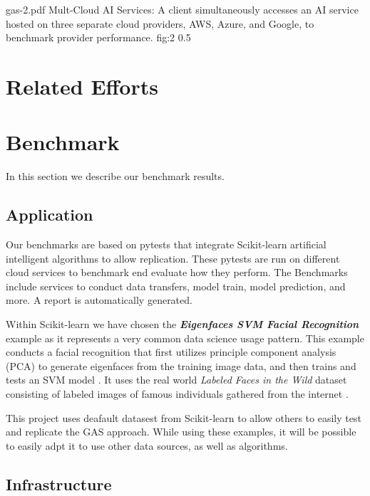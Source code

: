 \OneFIGURE
  {gas-2.pdf}
  {Mult-Cloud AI Services: A client simultaneously accesses an AI service hosted
   on three separate cloud providers, AWS, Azure, and Google, to benchmark
   provider performance.}
  {fig:2}
  {0.5}

\section{Related Efforts}


\section{Benchmark}
\label{sec:benchmark}

In this section we describe our benchmark results.

\subsection{Application}

Our benchmarks are based on pytests that integrate Scikit-learn
artificial intelligent algorithms to allow replication. These pytests
are run on different cloud services to benchmark end evaluate how they
perform. The Benchmarks include services to conduct data transfers,
model train, model prediction, and more. A report is automatically generated. 

Within Scikit-learn we have chosen the {\bf\em Eigenfaces SVM Facial
Recognition} example as it represents a very common data science usage
pattern. This example conducts a facial recognition that first
utilizes principle component analysis (PCA) to generate eigenfaces
from the training image data, and then trains and tests an SVM
model \cite{www-skikit-learn-faces}. It uses the real world
{\em Labeled Faces in the Wild} dataset consisting of labeled images
of famous individuals gathered from the internet \cite{faces-data}.

This project uses deafault datasest from Scikit-learn to allow others
to easily test and replicate the GAS approach. While using these
examples, it will be possible to easily adpt it to use other data
sources, as well as algorithms.


\subsection{Infrastructure}

